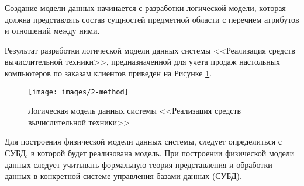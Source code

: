 Создание модели данных начинается с разработки логической модели, которая
должна представлять состав сущностей предметной области с перечнем атрибутов и
отношений между ними.

%
%
%
%

Результат разработки логической модели данных системы <<Реализация средств
вычислительной техники>>, предназначенной для учета продаж настольных
компьютеров по заказам клиентов приведен на Рисунке \ref{fig:2-logical-model-method}.

\begin{figure}[htpb]
	\centering
	\texttt{[image: images/2-method]}
	\caption{Логическая модель данных системы <<Реализация средств вычислительной техники>>}
	\label{fig:2-logical-model-method}
\end{figure}

Для построения физической модели данных системы, следует определиться с СУБД, в которой будет реализована модель. При построении физической модели данных следует учитывать формальную теория представления и обработки данных в конкретной системе управления базами данных (СУБД).

